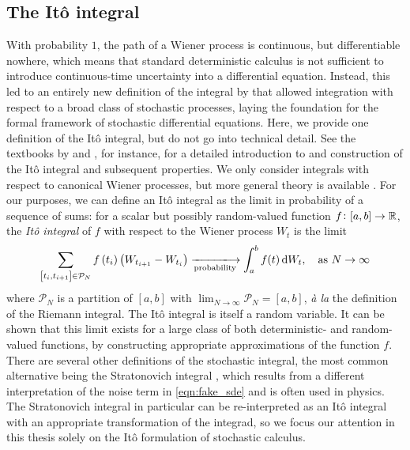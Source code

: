 \subsection{The It\^o integral}\label{sec:bkg_ito}
With probability \(1\), the path of a Wiener process is continuous, but differentiable nowhere, which means that standard deterministic calculus is not sufficient to introduce continuous-time uncertainty into a differential equation.
Instead, this led to an entirely new definition of the integral by \citet{Ito_1944_StochasticIntegral,Ito_1946_StochasticIntegralEquation} that allowed integration with respect to a broad class of stochastic processes, laying the foundation for the formal framework of stochastic differential equations.
Here, we provide one definition of the It\^o integral, but do not go into technical detail.
See the textbooks by \citet{KallianpurSundar_2014_StochasticAnalysisDiffusion} and \citet{Oksendal_2003_StochasticDifferentialEquations}, for instance, for a detailed introduction to and construction of the It\^o integral and subsequent properties.
We only consider integrals with respect to canonical Wiener processes, but more general theory is available \citep{Applebaum_2004_LevyProcessesStochastic}.
For our purposes, we can define an It\^o integral as the limit in probability of a sequence of sums: for a scalar but possibly random-valued function \(f\colon [a,b] \to \mathbb{R}\), the \emph{It\^o integral} of \(f\) with respect to the Wiener process \(W_t\) is the limit
\begin{equation}\label{eqn:ito_int_limit_defn}
	\sum_{\left[t_i, t_{i+1}\right] \in \mathcal{P}_N}{f\left(t_{i}\right)\left(W_{t_{i+1}} - W_{t_i}\right)} \xlongrightarrow[\text{probability}]{} \int_a^b{f(t)\dif W_t}, \quad \text{as } N \to \infty
\end{equation}
where \(\mathcal{P}_N\) is a partition of \(\left[a,b\right]\) with \(\lim_{N \to \infty}\mathcal{P}_N = [a,b]\), \emph{\`a la} the definition of the Riemann integral.
The It\^o integral is itself a random variable.
It can be shown \citep[e.g.]{KallianpurSundar_2014_StochasticAnalysisDiffusion,Oksendal_2003_StochasticDifferentialEquations} that this limit exists for a large class of both deterministic- and random-valued functions, by constructing appropriate approximations of the function \(f\).
There are several other definitions of the stochastic integral, the most common alternative being the Stratonovich integral \citep{Stratonovich_1966_NewRepresentationStochastic}, which results from a different interpretation of the noise term in \cref{eqn:fake_sde} and is often used in physics.
The Stratonovich integral in particular can be re-interpreted as an It\^o integral with an appropriate transformation of the integrad, so we focus our attention in this thesis solely on the It\^o formulation of stochastic calculus.

